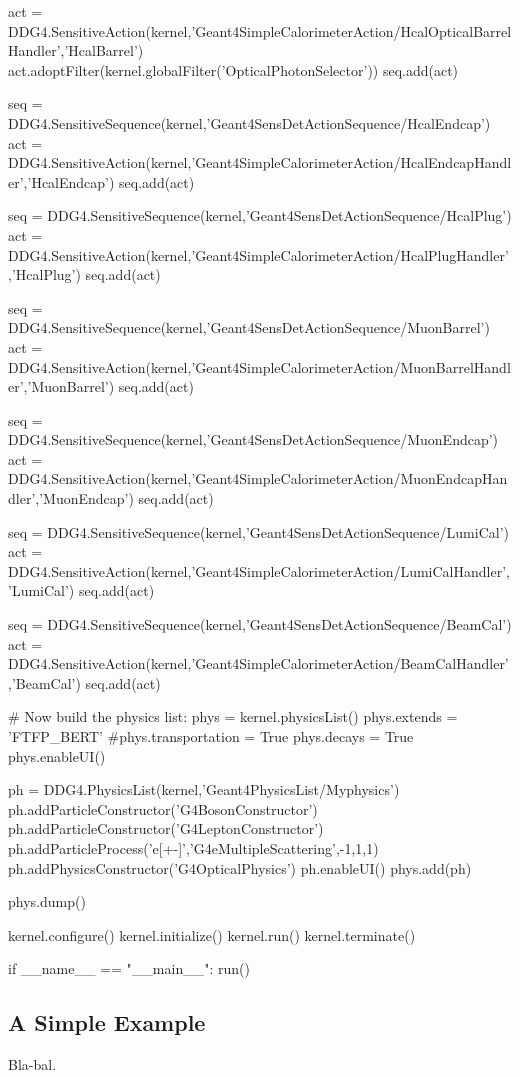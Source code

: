 \documentclass[10pt,a4paper]{article}
\begin{document}
\begin{code}
  act = DDG4.SensitiveAction(kernel,'Geant4SimpleCalorimeterAction/HcalOpticalBarrelHandler','HcalBarrel')
  act.adoptFilter(kernel.globalFilter('OpticalPhotonSelector'))
  seq.add(act)

  seq = DDG4.SensitiveSequence(kernel,'Geant4SensDetActionSequence/HcalEndcap')
  act = DDG4.SensitiveAction(kernel,'Geant4SimpleCalorimeterAction/HcalEndcapHandler','HcalEndcap')
  seq.add(act)

  seq = DDG4.SensitiveSequence(kernel,'Geant4SensDetActionSequence/HcalPlug')
  act = DDG4.SensitiveAction(kernel,'Geant4SimpleCalorimeterAction/HcalPlugHandler','HcalPlug')
  seq.add(act)

  seq = DDG4.SensitiveSequence(kernel,'Geant4SensDetActionSequence/MuonBarrel')
  act = DDG4.SensitiveAction(kernel,'Geant4SimpleCalorimeterAction/MuonBarrelHandler','MuonBarrel')
  seq.add(act)

  seq = DDG4.SensitiveSequence(kernel,'Geant4SensDetActionSequence/MuonEndcap')
  act = DDG4.SensitiveAction(kernel,'Geant4SimpleCalorimeterAction/MuonEndcapHandler','MuonEndcap')
  seq.add(act)

  seq = DDG4.SensitiveSequence(kernel,'Geant4SensDetActionSequence/LumiCal')
  act = DDG4.SensitiveAction(kernel,'Geant4SimpleCalorimeterAction/LumiCalHandler','LumiCal')
  seq.add(act)

  seq = DDG4.SensitiveSequence(kernel,'Geant4SensDetActionSequence/BeamCal')
  act = DDG4.SensitiveAction(kernel,'Geant4SimpleCalorimeterAction/BeamCalHandler','BeamCal')
  seq.add(act)

  # Now build the physics list:
  phys = kernel.physicsList()
  phys.extends = 'FTFP_BERT'
  #phys.transportation = True
  phys.decays  = True
  phys.enableUI()

  ph = DDG4.PhysicsList(kernel,'Geant4PhysicsList/Myphysics')
  ph.addParticleConstructor('G4BosonConstructor')
  ph.addParticleConstructor('G4LeptonConstructor')
  ph.addParticleProcess('e[+-]','G4eMultipleScattering',-1,1,1)
  ph.addPhysicsConstructor('G4OpticalPhysics')
  ph.enableUI()
  phys.add(ph)

  phys.dump()

  kernel.configure()
  kernel.initialize()
  kernel.run()
  kernel.terminate()

if __name__ == "__main__":
  run()

\end{code}

\newpage
\subsection{A Simple Example}
\label{sec:ddg4-implementation-simple-example}
\noindent
Bla-bal.
\end{document}
